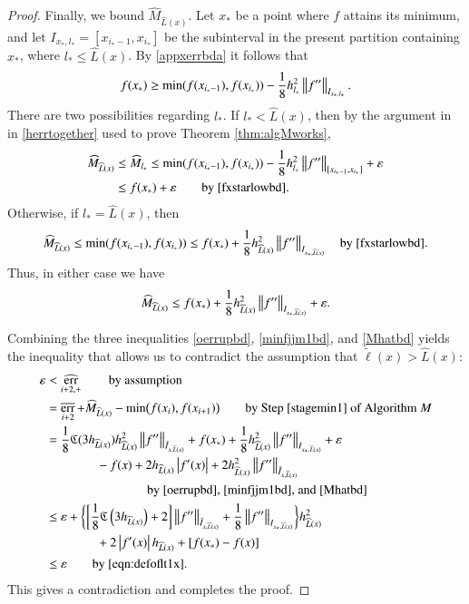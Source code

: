 \documentclass[review]{elsarticle}
\newcommand{\abstol}{\varepsilon}
\theoremstyle{definition}
\newcommand{\tell}{\tilde{\ell}}
\newcommand{\chL}{\widehat{L}}
\newcommand{\hM}{\widehat{M}}
\DeclareMathOperator{\oerr}{\overline{err}}
\DeclareMathOperator{\herr}{\widehat{err}}
\begin{document}
\begin{proof}
Finally, we bound $ \hM_{\chL(x)}$. Let $x_*$ be a point where $f$ attains its minimum,
and
let $I_{x_*,l_*} = [x_{i_*-1}, x_{i_*}]$ be the subinterval in the present partition containing
$x_*$, where $l_* \le \chL(x)$. By
\eqref{appxerrbda} it follows that
\begin{equation} \label{fxstarlowbd}
f(x_*) \ge \min(f(x_{i_*-1}),f(x_{i_*})) - \frac18 h_{l_*}^2\norm[I_{x_*,l_*}]{f''}.
\end{equation}
There are two possibilities regarding $l_*$. If $l_* < \chL(x)$, then by the argument in  in
\eqref{herrtogether} used to prove Theorem \ref{thm:algMworks},
\begin{align*}
\hM_{\chL(x)}   & \le \hM_{l_*}
\le \min(f(x_{i_*-1}),f(x_{i_*})) - \frac18 h_{l_*}^2 \norm[{[x_{i_*-1}, x_{i_*}]}]{f''}  + \abstol  \\
& \le  f(x_*) + \abstol \qquad \text{by}~\eqref{fxstarlowbd} .
\end{align*}
Otherwise, if $l_* = \chL(x)$, then
\begin{equation*}
\hM_{\chL(x)}   \le \min(f(x_{i_*-1}),f(x_{i_*}))  \le  f(x_*) + \frac18 h_{\chL(x)}^2
\norm[{I_{x_*,\chL(x)}}]{f''} \quad \text{by}~\eqref{fxstarlowbd} .
\end{equation*}
Thus, in either case we have
\begin{equation} \label{Mhatbd}
\hM_{\chL(x)} \le f(x_*) + \frac 18 h_{\chL(x)}^2  \norm[{I_{x_*,\chL(x)}}]{f''} + \abstol.
\end{equation}

Combining the three inequalities \eqref{oerrupbd}, \eqref{minfjjm1bd}, and
\eqref{Mhatbd} yields the inequality that allows us to contradict the assumption
that $\tell(x) > \chL(x)$:
\begin{align*}
\abstol & < \herr_{i+2,+} \qquad \text{by assumption} \\
& = \oerr_{i+2} + \hM_{\chL(x)} - \min\bigl(f(x_{i}),f(x_{i+1})\bigr) \qquad \text{by Step
\ref{stagemin1} of Algorithm $M$} \\
& = \frac{1}{8} \fC(3 h_{\chL(x)}) h_{\chL(x)}^2 \norm[\tilde{I}_{x,\chL(x)}]{f''} + f(x_*) +
\frac 18 h_{\chL(x)}^2  \norm[{I_{x_*,\chL(x)}}]{f''} + \abstol \\
& \qquad \qquad - f(x) + 2h_{\chL(x)}\abs{f'(x)} + 2h_{\chL(x)}^2
\norm[\tilde{I}_{x,\chL(x)}]{f''} \\
&  \qquad \qquad \qquad  \qquad \text{by \eqref{oerrupbd}, \eqref{minfjjm1bd}, and
\eqref{Mhatbd}} \\
& \le \abstol + \biggl\{ \biggl[\frac 18 \fC\left(3 h_{\chL(x)} \right) + 2 \biggr]
\norm[\tilde{I}_{x,\chL(x)}]{f''} + \frac18\norm[{I_{x_*,\chL(x)}}]{f''} \biggr\} h_{\chL(x)}^2 \\
& \qquad \qquad +  2 \abs{f'(x)} h_{\chL(x)} + [f(x_*) - f(x)] \\
& \le \abstol \qquad \text{by \eqref{eqn:defoflt1x}}.
\end{align*}
This gives a contradiction and completes the proof.
\end{proof}
\end{document}
